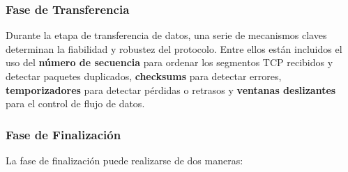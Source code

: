 \subsubsection{Fase de Transferencia}
Durante la etapa de transferencia de datos, una serie de mecanismos claves determinan la fiabilidad y robustez del protocolo. Entre ellos están incluidos el uso del \textbf{número de secuencia} para ordenar los segmentos TCP recibidos y detectar paquetes duplicados, \textbf{checksums} para detectar errores, \textbf{temporizadores} para detectar pérdidas o retrasos y \textbf{ventanas deslizantes} para el control de flujo de datos.
\subsubsection{Fase de Finalización}
La fase de finalización puede realizarse de dos maneras:

